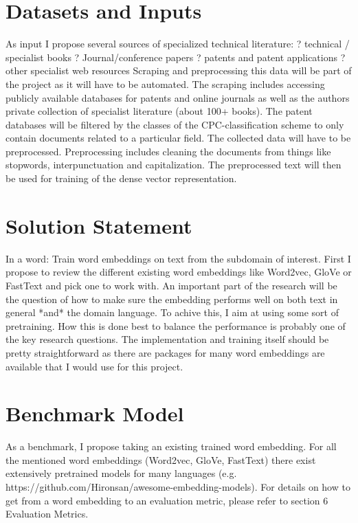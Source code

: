 \documentclass[10pt,a4paper]{article}
\begin{document}
	\section{Datasets and Inputs}
	As input I propose several sources of specialized technical literature: 
	? technical / specialist books
	? Journal/conference papers
	? patents and patent applications
	? other specialist web resources 
	Scraping and preprocessing this data will be part of the project as it will have to be automated. The scraping includes accessing publicly available databases for patents and online journals as well as the authors private collection of specialist literature (about 100+ books). The patent databases will be filtered by the classes of the CPC-classification scheme to only contain documents related to a particular field.
	The collected data will have to be preprocessed. Preprocessing includes cleaning the documents from things like stopwords, interpunctuation and capitalization. The preprocessed text will then be used for training of the dense vector representation. 
	
	\section{Solution Statement}
	In a word: Train word embeddings on text from the subdomain of interest.
	First I propose to review the different existing word embeddings like Word2vec, GloVe or  FastText and pick one to work with. An important part of the research will be the question of how to make sure the embedding performs well on both text in general *and* the domain language. To achive this, I aim at using some sort of pretraining. How this is done best to balance the performance is probably one of the key research questions.
	The implementation and training itself should be pretty straightforward as there are packages for many word embeddings are available that I would use for this project.
	
	\section{Benchmark Model}
	As a benchmark, I propose taking an existing trained word embedding. For all the mentioned word embeddings (Word2vec, GloVe, FastText) there exist extensively pretrained models for many languages (e.g. https://github.com/Hironsan/awesome-embedding-models). For details on how to get from a word embedding to an evaluation metric, please refer to section 6 Evaluation Metrics.
	
\end{document}

